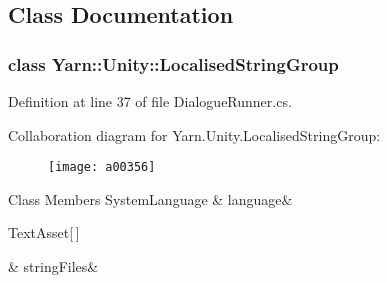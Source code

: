 \subsection{Class Documentation}
\label{a00350}
\hypertarget{a00127_a00350}{}
\subsubsection{class Yarn\-:\-:Unity\-:\-:Localised\-String\-Group}


Definition at line 37 of file Dialogue\-Runner.\-cs.



Collaboration diagram for Yarn.\-Unity.\-Localised\-String\-Group\-:
\nopagebreak
\begin{figure}[H]
\begin{center}
\leavevmode
\texttt{[image: a00356]}
\end{center}
\end{figure}
\begin{DoxyFields}{Class Members}
\hypertarget{a00127_a395d808fa32cb4fe68a62d7852534e1a}{System\-Language}\label{a00127_a395d808fa32cb4fe68a62d7852534e1a}
&
language&
\\
\hline

\hypertarget{a00127_a636624112fd57fedda96d485d20e6b9e}{Text\-Asset\mbox{[}$\,$\mbox{]}}\label{a00127_a636624112fd57fedda96d485d20e6b9e}
&
string\-Files&
\\
\hline

\end{DoxyFields}
